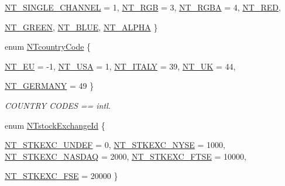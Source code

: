 \begin{DoxyCompactItemize}
\hyperlink{nt__codes_8h_ad1bb9d54b61901f8e764e6cf0694e52faf92b83e2aa275791b364fdbfdfc5616b}{NT\_\-SINGLE\_\-CHANNEL} =  1, 
\hyperlink{nt__codes_8h_ad1bb9d54b61901f8e764e6cf0694e52faf49f88e72d2f0458a79b84490d619476}{NT\_\-RGB} =  3, 
\hyperlink{nt__codes_8h_ad1bb9d54b61901f8e764e6cf0694e52faebe728d01369a7498c09f57079a09a32}{NT\_\-RGBA} =  4, 
\hyperlink{nt__codes_8h_ad1bb9d54b61901f8e764e6cf0694e52faee23079bec005f53356109bcb4b5e22b}{NT\_\-RED}, 
\par
\hyperlink{nt__codes_8h_ad1bb9d54b61901f8e764e6cf0694e52fa712ae047fc3f027ffb5ba93bb02054e4}{NT\_\-GREEN}, 
\hyperlink{nt__codes_8h_ad1bb9d54b61901f8e764e6cf0694e52fa69ba4662a47d91404fc16125c83461ba}{NT\_\-BLUE}, 
\hyperlink{nt__codes_8h_ad1bb9d54b61901f8e764e6cf0694e52faf89328f822d34bd1be654a8393d3a9fd}{NT\_\-ALPHA}
 \}
\item 
enum \hyperlink{nt__codes_8h_a191e0d46d9a7cf01d8861afa7c41eb88}{NTcountryCode} \{ \par
\hyperlink{nt__codes_8h_a191e0d46d9a7cf01d8861afa7c41eb88a7c2ca49d41da853036a5e62da587701b}{NT\_\-EU} = -\/1, 
\hyperlink{nt__codes_8h_a191e0d46d9a7cf01d8861afa7c41eb88a4563f9b0fce598c9c1094721f07eff6b}{NT\_\-USA} = 1, 
\hyperlink{nt__codes_8h_a191e0d46d9a7cf01d8861afa7c41eb88a469b63153ca4fc3d5c25edd3b35e2fb4}{NT\_\-ITALY} = 39, 
\hyperlink{nt__codes_8h_a191e0d46d9a7cf01d8861afa7c41eb88a0a34e325b6bb9c101d39bee9b5ad70ef}{NT\_\-UK} = 44, 
\par
\hyperlink{nt__codes_8h_a191e0d46d9a7cf01d8861afa7c41eb88ab7f4697fb98d190a0731d7accda33675}{NT\_\-GERMANY} = 49
 \}
\begin{DoxyCompactList}\small\item\em COUNTRY CODES == intl. \item\end{DoxyCompactList}\item 
enum \hyperlink{nt__codes_8h_aaf531d96031e5c13165883c0be3a49a4}{NTstockExchangeId} \{ \par
\hyperlink{nt__codes_8h_aaf531d96031e5c13165883c0be3a49a4acf515448b03ff442f341b3b2bc59635b}{NT\_\-STKEXC\_\-UNDEF} = 0, 
\hyperlink{nt__codes_8h_aaf531d96031e5c13165883c0be3a49a4a2c361aee5f3518fbd5d800eaf98cf077}{NT\_\-STKEXC\_\-NYSE} = 1000, 
\hyperlink{nt__codes_8h_aaf531d96031e5c13165883c0be3a49a4ae2e87c1b2caafea407b90d760b641330}{NT\_\-STKEXC\_\-NASDAQ} = 2000, 
\hyperlink{nt__codes_8h_aaf531d96031e5c13165883c0be3a49a4accc9cb42be4e2aaa048ca9f4ff98b922}{NT\_\-STKEXC\_\-FTSE} = 10000, 
\par
\hyperlink{nt__codes_8h_aaf531d96031e5c13165883c0be3a49a4ab551a19598bd4aec12111b81632ca987}{NT\_\-STKEXC\_\-FSE} = 20000
 \}
\end{DoxyCompactItemize}



